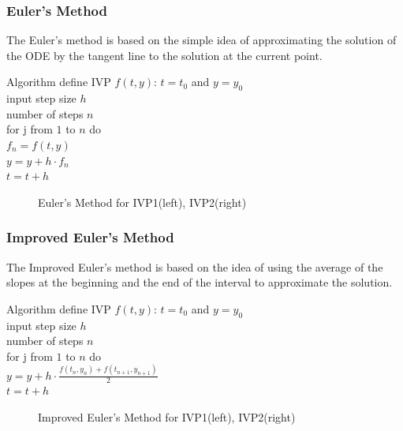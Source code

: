 \documentclass[UTF8]{beamer}
\begin{document}

\begin{frame}[allowframebreaks]
\frametitle{Euler's Method}
The Euler's method is based on the simple idea of approximating the solution of the ODE by the tangent line to the solution at the current point.
\begin{block}{Algorithm}
define IVP $f(t,y)$: $t = t_0$ and $y = y_0$ \\
input step size $h$ \\number of steps $n$ \\
for j from $1$ to $n$ do\\
$f_n=f(t,y)$\\
$y = y + h \cdot f_n$\\ $
t=t+h$
\end{block}
	\begin{figure}
		\centering
		\scalebox{0.45}{}
		\caption{Euler's Method for IVP1(left), IVP2(right)}
	\end{figure}
\end{frame}	

\begin{frame}[allowframebreaks]
	\frametitle{Improved Euler's Method}
The Improved Euler's method is based on the idea of using the average of the slopes at the beginning and the end of the interval to approximate the solution.
\begin{block}{Algorithm}
define IVP $f(t,y)$: $t = t_0$ and $y = y_0$ \\
input step size $h$ \\number of steps $n$ \\
for j from $1$ to $n$ do\\
$y = y + h \cdot \frac{f(t_n,y_n)+f(t_{n+1},y_{n+1})}{2}$\\ $
t=t+h$
\end{block}
	\begin{figure}
		\centering
		\scalebox{0.45}{}
		\caption{Improved Euler's Method for IVP1(left), IVP2(right)}
	\end{figure}
\end{frame}	
\end{document}
